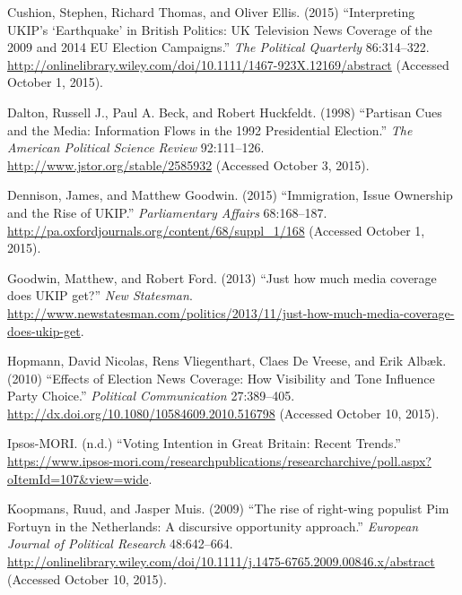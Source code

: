\documentclass[12pt,article]{article}
\begin{document}
Cushion, Stephen, Richard Thomas, and Oliver Ellis. (2015)
``Interpreting UKIP's `Earthquake' in British Politics: UK Television
News Coverage of the 2009 and 2014 EU Election Campaigns.'' \emph{The
Political Quarterly} 86:314--322.
\url{http://onlinelibrary.wiley.com/doi/10.1111/1467-923X.12169/abstract}
(Accessed October 1, 2015).

Dalton, Russell J., Paul A. Beck, and Robert Huckfeldt. (1998)
``Partisan Cues and the Media: Information Flows in the 1992
Presidential Election.'' \emph{The American Political Science Review}
92:111--126. \url{http://www.jstor.org/stable/2585932} (Accessed October
3, 2015).

Dennison, James, and Matthew Goodwin. (2015) ``Immigration, Issue
Ownership and the Rise of UKIP.'' \emph{Parliamentary Affairs}
68:168--187. \url{http://pa.oxfordjournals.org/content/68/suppl_1/168}
(Accessed October 1, 2015).

Goodwin, Matthew, and Robert Ford. (2013) ``Just how much media coverage
does UKIP get?'' \emph{New Statesman}.
\url{http://www.newstatesman.com/politics/2013/11/just-how-much-media-coverage-does-ukip-get}.

Hopmann, David Nicolas, Rens Vliegenthart, Claes De Vreese, and Erik
Albæk. (2010) ``Effects of Election News Coverage: How Visibility and
Tone Influence Party Choice.'' \emph{Political Communication}
27:389--405. \url{http://dx.doi.org/10.1080/10584609.2010.516798}
(Accessed October 10, 2015).

Ipsos-MORI. (n.d.) ``Voting Intention in Great Britain: Recent Trends.''
\url{https://www.ipsos-mori.com/researchpublications/researcharchive/poll.aspx?oItemId=107\&view=wide}.

Koopmans, Ruud, and Jasper Muis. (2009) ``The rise of right-wing
populist Pim Fortuyn in the Netherlands: A discursive opportunity
approach.'' \emph{European Journal of Political Research} 48:642--664.
\url{http://onlinelibrary.wiley.com/doi/10.1111/j.1475-6765.2009.00846.x/abstract}
(Accessed October 10, 2015).
\end{document}
